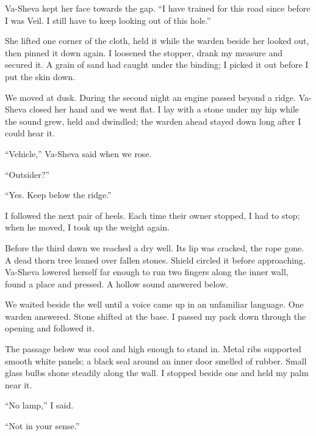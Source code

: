 Va-Sheva kept her face towards the gap. ``I have trained for this road since before I was Veil. I still have to keep looking out of this hole.''\par

She lifted one corner of the cloth, held it while the warden beside her looked out, then pinned it down again. I loosened the stopper, drank my measure and secured it. A grain of sand had caught under the binding; I picked it out before I put the skin down.\par

We moved at dusk. During the second night an engine passed beyond a ridge. Va-Sheva closed her hand and we went flat. I lay with a stone under my hip while the sound grew, held and dwindled; the warden ahead stayed down long after I could hear it.\par

``Vehicle,'' Va-Sheva said when we rose.\par

``Outsider?''\par

``Yes. Keep below the ridge.''\par

I followed the next pair of heels. Each time their owner stopped, I had to stop; when he moved, I took up the weight again.\par

Before the third dawn we reached a dry well. Its lip was cracked, the rope gone. A dead thorn tree leaned over fallen stones. Shield circled it before approaching. Va-Sheva lowered herself far enough to run two fingers along the inner wall, found a place and pressed. A hollow sound answered below.\par

We waited beside the well until a voice came up in an unfamiliar language. One warden answered. Stone shifted at the base. I passed my pack down through the opening and followed it.\par

The passage below was cool and high enough to stand in. Metal ribs supported smooth white panels; a black seal around an inner door smelled of rubber. Small glass bulbs shone steadily along the wall. I stopped beside one and held my palm near it.\par

``No lamp,'' I said.\par

``Not in your sense.''\par

